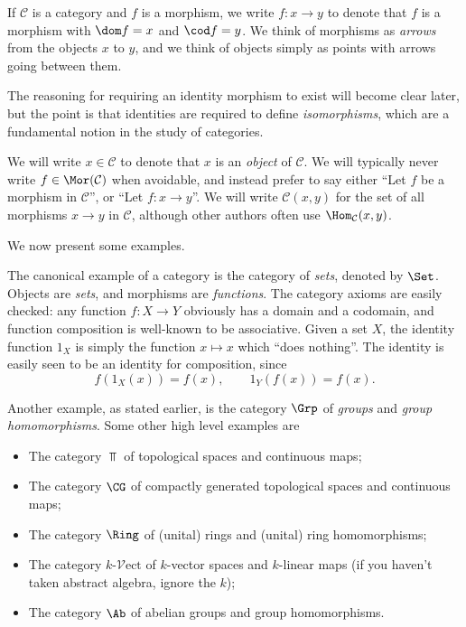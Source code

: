 \documentclass[11pt, A4]{article}
\begin{document}
\begin{remark}\label{2.3}
	If $\mathcal{C} $ is a category and $f$ is a morphism, we write $f : x \to y$ to denote that $f$ is a morphism with $\dom f=  x$ and $\cod f = y$. We think of morphisms as \emph{arrows} from the objects $x$ to $y$, and we think of objects simply as points with arrows going between them.
\end{remark}
\begin{remark}\label{2.4}
	The reasoning for requiring an identity morphism to exist will become clear later, but the point is that identities are required to define \emph{isomorphisms}, which are a fundamental notion in the study of categories.
\end{remark}

We will write $x\in \mathcal{C} $ to denote that $x$ is an \emph{object} of $\mathcal{C} $. We will typically never write $f\in\Mor(\mathcal{C} )$ when avoidable, and instead prefer to say either ``Let $f$ be a morphism in $\mathcal{C} $'', or ``Let $f : x \to y$''. We will write $\mathcal{C} (x,y)$ for the set of all morphisms $x\to y$ in $\mathcal{C} $, although other authors often use $\Hom_\mathcal{C} (x, y) $.

We now present some examples.

\begin{example}\label{2.5}
	The canonical example of a category is the category of \emph{sets}, denoted by $\Set $. Objects are \emph{sets}, and morphisms are \emph{functions}. The category axioms are easily checked: any function $f : X \to Y$ obviously has a domain and a codomain, and function composition is well-known to be associative. Given a set $X$, the identity function $1_X$ is simply the function $x\mapsto x$ which ``does nothing''. The identity is easily seen to be an identity for composition, since
	\[
		f(1_X(x))=f(x),\qquad 1_Y(f(x))=f(x)
	.\]
\end{example}

\begin{example}\label{2.6}
	Another example, as stated earlier, is the category $\Grp $ of \emph{groups} and \emph{group homomorphisms}. Some other high level examples are
	\begin{itemize}
		\item The category $\Top $ of topological spaces and continuous maps;
		\item The category $\CG$ of compactly generated topological spaces and continuous maps;
		\item The category $\Ring $ of (unital) rings and (unital) ring homomorphisms;
		\item The category $k$-$\mathcal{V} \mathrm{ect} $ of $k$-vector spaces and $k$-linear maps (if you haven't taken abstract algebra, ignore the $k$);
		\item The category  $\Ab $ of abelian groups and group homomorphisms.
	\end{itemize}
\end{example}
\end{document}

